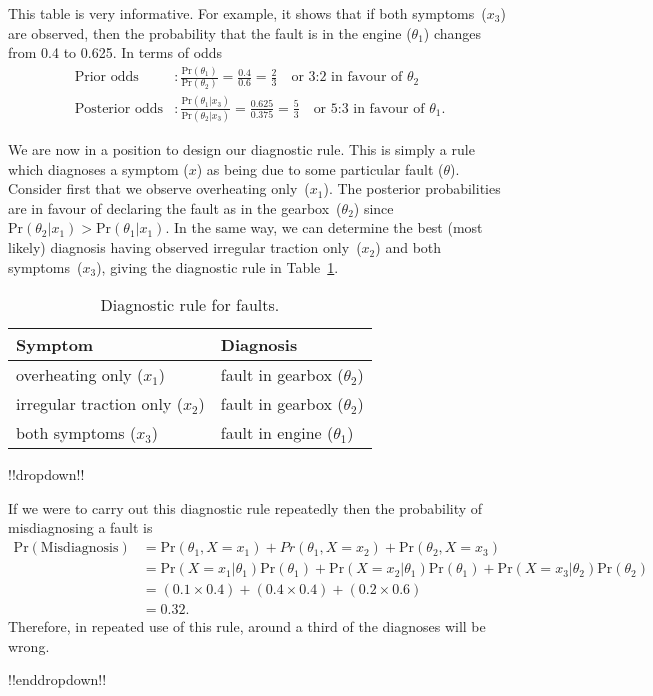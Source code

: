 {This table is very informative. For example, it shows that if both
symptoms~($x_3$) are observed, then the probability that the fault is
in the engine ($\theta_1$) changes from 0.4 to 0.625. In terms of
odds
\begin{align*}
\text{Prior odds}&:\frac{\text{Pr}(\theta_1)}{\text{Pr}(\theta_2)}
=\frac{0.4}{0.6}=\frac{2}{3}\quad\text{or 3:2 in favour of }\theta_2 \\
\text{Posterior odds}&:\frac{\text{Pr}(\theta_1|x_3)}{\text{Pr}(\theta_2|x_3)}
=\frac{0.625}{0.375}=
\frac{5}{3}\quad\text{or 5:3 in favour of }\theta_1.
\end{align*}

\clearpage

We are now in a position to design our diagnostic rule. This is simply
a rule which diagnoses a symptom ($x$) as being due to some particular
fault ($\theta$). Consider first that we observe overheating
only~($x_1$). The posterior probabilities are in favour of declaring
the fault as in the gearbox~($\theta_2$) since
$\text{Pr}(\theta_2|x_1)>\text{Pr}(\theta_1|x_1)$. In the same way, we can determine
the best (most likely) diagnosis having observed irregular traction
only~($x_2$) and both symptoms~($x_3$), giving the diagnostic rule in
Table~\ref{tab:garagediag}.

\begin{table}[ht]
\bigskip

\begin{tabular}{|l|l|}
\hline
\quad\quad Symptom & \quad\quad Diagnosis \\
\hline
overheating only ($x_1$) & fault in gearbox ($\theta_2$) \\
irregular traction only ($x_2$) & fault in gearbox ($\theta_2$) \\
both symptoms ($x_3$) & fault in engine ($\theta_1$) \\
\hline
\end{tabular}
\caption{Diagnostic rule for faults.}
\label{tab:garagediag}

\end{table}

 !!dropdown!!

If we were to carry out this diagnostic rule repeatedly then the
        probability of misdiagnosing a fault is
        \begin{align*}
        \text{Pr}(\text{Misdiagnosis}) &=\text{Pr}(\theta_1,X=x_1)+Pr(\theta_1,X=x_2)+\text{Pr}(\theta_2,X=x_3) \\
        &=\text{Pr}(X=x_1|\theta_1)\text{Pr}(\theta_1)+\text{Pr}(X=x_2|\theta_1)\text{Pr}(\theta_1) +\text{Pr}(X=x_3|\theta_2)\text{Pr}(\theta_2) \\
        &=(0.1\times 0.4)+(0.4\times 0.4)+(0.2\times 0.6) \\
        &=0.32.
        \end{align*}
        Therefore, in repeated use of this rule, around a third of the
        diagnoses will be wrong.

!!enddropdown!!}


